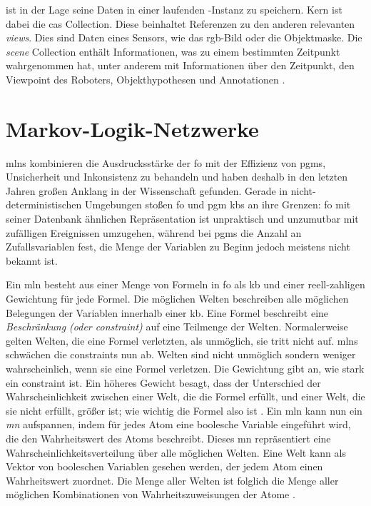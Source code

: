 \robosherlock ist in der Lage seine Daten in einer laufenden \mongodb-Instanz zu speichern. Kern ist dabei die \gls{cas} Collection. Diese beinhaltet Referenzen zu den anderen relevanten \textit{views}. Dies sind Daten eines Sensors, wie das \gls{rgb}-Bild oder die Objektmaske. Die \textit{scene} Collection enthält Informationen, was \robosherlock zu einem bestimmten Zeitpunkt wahrgenommen hat, unter anderem mit Informationen über den Zeitpunkt, den Viewpoint des Roboters, Objekthypothesen und Annotationen \cite{episodicMemory}.  



\section{Markov-Logik-Netzwerke}
\label{sec:mln}
\glspl{mln} kombinieren die Ausdrucksstärke der \gls{fo} mit der Effizienz von \glspl{pgm}, Unsicherheit und Inkonsistenz zu behandeln und haben deshalb in den letzten Jahren großen Anklang in der Wissenschaft gefunden. Gerade in nicht-deterministischen Umgebungen stoßen \gls{fo} und \gls{pgm} \glspl{kb} an ihre Grenzen: \gls{fo} mit seiner Datenbank ähnlichen Repräsentation ist unpraktisch und unzumutbar mit zufälligen Ereignissen umzugehen, während bei \glspl{pgm} die Anzahl an Zufallsvariablen fest, die Menge der Variablen zu Beginn jedoch meistens nicht bekannt ist. \cite{nyga17} \par 
Ein \gls{mln} besteht aus einer Menge von Formeln in \gls{fo} als \acrlong{kb} und einer reell-zahligen Gewichtung für jede Formel. Die möglichen Welten beschreiben alle möglichen Belegungen der Variablen innerhalb einer \gls{kb}. Eine Formel beschreibt eine \textit{Beschränkung (oder constraint)} auf eine Teilmenge der Welten. Normalerweise gelten Welten, die eine Formel verletzten, als unmöglich, sie tritt nicht auf. \glspl{mln} schwächen die constraints nun ab. Welten sind nicht unmöglich sondern weniger wahrscheinlich, wenn sie eine Formel verletzen. Die Gewichtung gibt an, wie stark ein constraint ist. Ein höheres Gewicht besagt, dass der Unterschied der Wahrscheinlichkeit zwischen einer Welt, die die Formel erfüllt, und einer Welt, die sie nicht erfüllt, größer ist; wie wichtig die Formel also ist \cite{mln}. Ein \gls{mln} kann nun ein \textit{\gls{mn}} aufspannen, indem für jedes Atom eine boolesche Variable eingeführt wird, die den Wahrheitswert des Atoms beschreibt. Dieses \gls{mn} repräsentiert eine Wahrscheinlichkeitsverteilung über alle möglichen Welten. Eine Welt kann als Vektor von booleschen Variablen gesehen werden, der jedem Atom einen Wahrheitswert zuordnet. Die Menge aller Welten ist folglich die Menge aller möglichen Kombinationen von Wahrheitszuweisungen der Atome \cite{nyga17}. \par
